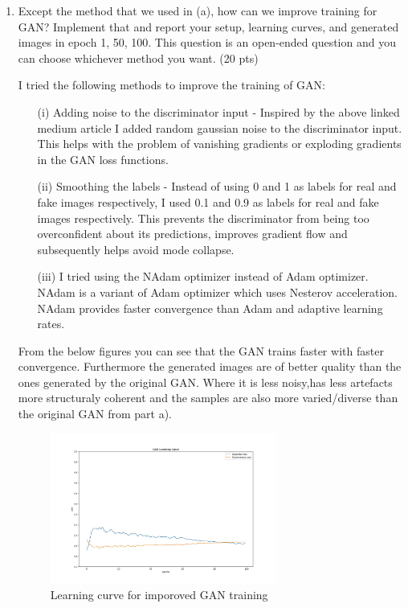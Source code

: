 \documentclass[a4paper]{article}
\theoremstyle{definition}
\newenvironment{soln}{
	\leavevmode\color{blue}\ignorespaces
}{}
\begin{document}
\begin{enumerate} [label=(\alph*)]
		\item Except the method that we used in (a), how can we improve training for GAN? Implement that and report your setup, learning curves, and generated images in epoch 1, 50, 100.
        This question is an open-ended question and you can choose whichever method you want.
		\hfill (20 pts)
		
		\begin{soln}
		
		I tried the following methods to improve the training of GAN:
		\begin{itemize}
			\item [(i)] Adding noise to the discriminator input - Inspired by the above linked medium article I added random gaussian noise to the discriminator input. This helps with the problem of vanishing gradients or exploding gradients in the GAN loss functions.
			\item [(ii)] Smoothing the labels - Instead of using 0 and 1 as labels for real and fake images respectively, I used 0.1 and 0.9 as labels for real and fake images respectively. This prevents the discriminator from being too overconfident about its predictions, improves gradient flow and subsequently helps avoid mode collapse.
			\item [(iii)] I tried using the NAdam optimizer instead of Adam optimizer. NAdam is a variant of Adam optimizer which uses Nesterov acceleration. NAdam provides faster convergence than Adam and adaptive learning rates.
		\end{itemize}

		From the below figures you can see that the GAN trains faster with faster convergence. Furthermore the generated images are of better quality than the ones generated by the original GAN. Where it is less noisy,has less artefacts more structuraly coherent and the samples are also more varied/diverse than the original GAN from part a).

			\begin{soln}
				\begin{figure}[H]
					\centering
					\includegraphics[width=0.7\textwidth]{../outputs-c-nadm-smooth/loss-100.jpg}
					\caption{Learning curve for imporoved GAN training}
					\label{fig:gan_q1_loss_submission}
				\end{figure}
				

\end{soln}
\end{soln}
\end{enumerate}
\end{document}
